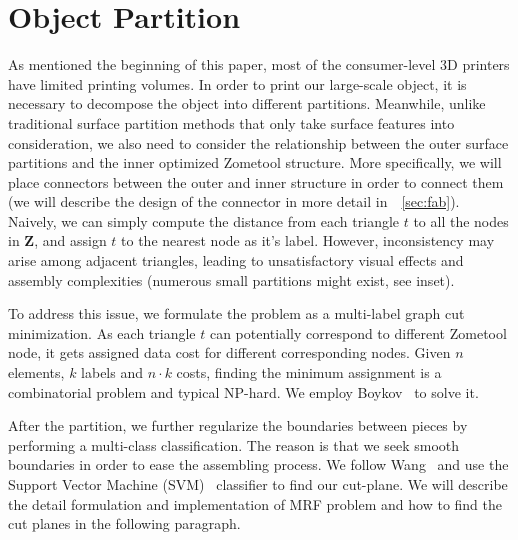 \section{Object Partition}
\label{sec:surf_part}
As mentioned  the beginning of this paper, most of the consumer-level 3D printers have limited printing volumes.
In order to print our large-scale object, it is necessary to decompose the object into different partitions.
Meanwhile, unlike traditional surface partition methods that only take surface features into consideration, we also need to consider the relationship between the outer surface partitions and the inner optimized Zometool structure.
More specifically, we will place connectors between the outer and inner structure in order to connect them (we will describe the design of the connector in more detail in~\secname~\ref{sec:fab}).
Naively, we can simply compute the distance from each triangle $t$ to all the nodes in $\mathbf{Z}$, and assign $t$ to the nearest node as it's label.
However, inconsistency may arise among adjacent triangles, leading to unsatisfactory visual effects and assembly complexities (numerous small partitions might exist, see inset). 


To address this issue, we formulate the problem as a multi-label graph cut minimization.
As each triangle $t$ can potentially correspond to different Zometool node, it gets assigned data cost for different corresponding nodes.
Given $n$ elements, $k$ labels and $n\cdot k$ costs, finding the minimum assignment is a combinatorial problem and typical NP-hard.
We employ Boykov~\cite{boykov:2004:experimental} to solve it.

After the partition, we further regularize the boundaries between pieces by performing a multi-class classification.
The  reason is that we seek smooth boundaries in order to ease the assembling process.
We follow Wang~\cite{wang2016improved} and use the Support Vector Machine (SVM)~\cite{cortes1995support} classifier to find our cut-plane. 
We will describe the detail formulation and implementation of MRF problem and how to find the cut planes in the following paragraph.

